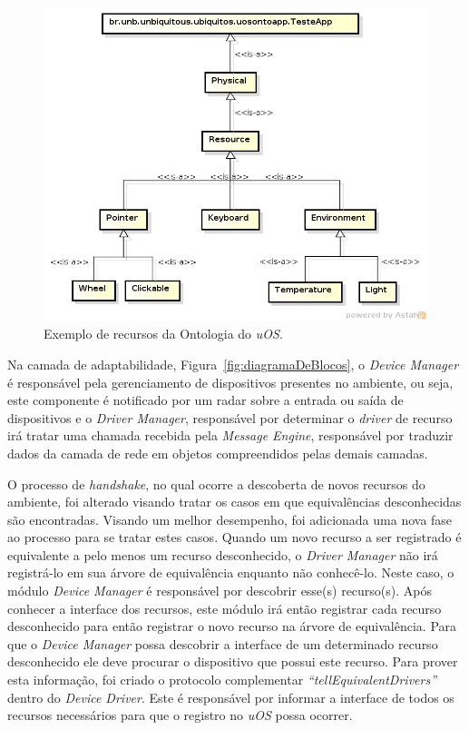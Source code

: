 \begin{figure}[ht]
	\center
	\includegraphics[scale=0.7]{imagens/ontologia}
	\caption{Exemplo de recursos da Ontologia do \emph{uOS}.}
	\label{fig:ontologiaUOS}
\end{figure}

Na camada de adaptabilidade, Figura~\ref{fig:diagramaDeBlocos}, o \emph{Device Manager} é responsável pela gerenciamento de dispositivos presentes no ambiente, ou seja, este componente é notificado por um radar sobre a entrada ou saída de dispositivos e o \emph{Driver Manager}, responsável por determinar o \emph{driver} de recurso irá tratar uma chamada recebida pela \emph{Message Engine}, responsável por traduzir dados da camada de rede em objetos compreendidos pelas demais camadas.

O processo de \emph{handshake}, no qual ocorre a descoberta de novos recursos do ambiente, foi alterado visando tratar os casos em que equivalências desconhecidas são encontradas. Visando um melhor desempenho, foi adicionada uma nova fase ao processo para se tratar estes casos. Quando um novo recurso a ser registrado é equivalente a pelo menos um recurso desconhecido, o \emph{Driver Manager} não irá registrá-lo em sua árvore de equivalência enquanto não conhecê-lo. Neste caso, o módulo \emph{Device Manager} é responsável por descobrir esse(s) recurso(s). Após conhecer a interface dos recursos, este módulo irá então registrar cada recurso desconhecido para então registrar o novo recurso na árvore de equivalência. Para que o \emph{Device Manager} possa descobrir a interface de um determinado recurso desconhecido ele deve procurar o dispositivo que possui este recurso. Para prover esta informação, foi criado o protocolo complementar \emph{``tellEquivalentDrivers''} dentro do \emph{Device Driver}. Este é responsável por informar a interface de todos os recursos necessários para que o registro no \emph{uOS} possa ocorrer.